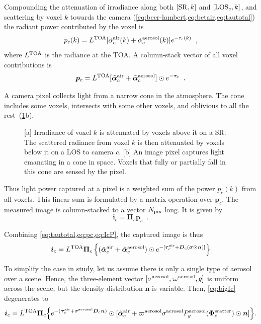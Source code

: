 \documentclass[10pt,letterpaper]{article}
\newcommand{\vect}[1]{\bm{#1}}
\newcommand{\yoavcomment}[1]{}
\renewcommand{\yoavcomment}[1]{#1} %
\begin{document}
Compounding the attenuation of irradiance along both $[{\rm SR},k]$
and $[{\rm LOS}_c,k]$, and scattering by voxel $k$ towards the camera
(\cref{eq:beer-lambert,eq:betair,eq:tautotal}) the radiant power
contributed by the voxel is
\begin{equation}
  p_c(k)= L^{\rm TOA}
  [\tilde{\alpha}^{\rm air}_c(k) + \tilde{\alpha}^{\rm aerosol}_c(k)]
  e^{-\tau_c(k)}
  \;\;,
  \label{eq:ick}
\end{equation}
where $L^{\rm TOA}$ is the radiance at the TOA. A column-stack vector
of all voxel contributions is
\begin{equation}
  {\bm p}_c= L^{\rm TOA}
  [\tilde{\vect{\alpha}}^{\rm air}_c + \tilde{\vect{\alpha}}^{\rm aerosol}_c]
  \odot e^{-\vect{\tau}_c}
  \;\;.
  \label{eq:pc}
\end{equation}

A camera pixel collects light from a narrow cone in the
atmosphere. The cone includes some voxels, intersects with some other
voxels, and oblivious to all the rest~(\cref{fig:projection}b).
\begin{figure}
  \centering
  \yoavcomment{\def\svgwidth{0.8\columnwidth}}
  \caption{\small [a] Irradiance of voxel $k$ is attenuated by voxels
    above it on a SR. The scattered radiance from voxel $k$ is then
    attenuated by voxels below it on a LOS to camera $c$.  [b] An
    image pixel captures light emanating in a cone in space. Voxels
    that fully or partially fall in this cone are sensed by the
    pixel.}
  \label{fig:projection}
\end{figure}
Thus light power captured at a pixel is a weighted sum of the power
$p_c(k)$ from all voxels.  This linear sum is formulated by a matrix
operation over ${\bm p}_c$. The measured image is column-stacked to a
vector $N_{\rm pix}$ long. It is given by
\begin{equation}
  {\bm i}_c= {\vect{\Pi}}_c{\bm p}_c
  \;\;.
  \label{eq:IcP}
\end{equation}

Combining \cref{eq:tautotal,eq:pc,eq:IcP}, the captured image is thus
\begin{align}
  {\bm i}_c= L^{\rm TOA} {\vect{\Pi}}_c \left\{
    (\tilde{\vect{\alpha}}^{\rm air}_c + \tilde{\vect{\alpha}}^{\rm
      aerosol}_c) \odot e^{-[\vect{\tau}_c^{\rm air} + {\bm D}_c
      (\vect{\sigma} \odot {\bm n})]} \right\}
  \label{eq:bigIc}
\end{align}

To simplify the case in study, let us assume there is only a single
type of aerosol over a scene. Hence, the three-element vector
$[{\sigma}^{\rm aerosol},\varpi^{\rm aerosol},g]$ is uniform across
the scene, but the density distribution ${\bm n}$ is variable. Then,
\cref{eq:bigIc} degenerates to
\begin{align}
  {\bm i}_c= L^{\rm TOA} {\vect{\Pi}}_c \Big\{ e^{-(\vect{\tau}_c^{\rm
      air} + {\sigma}^{\rm aerosol} {\bm D}_c {\bm n}) }\odot
  [\tilde{\vect{\alpha}}^{\rm air}_c + 
  \varpi^{\rm aerosol}\sigma^{\rm aerosol} P^{\rm
    aerosol}_g(\vect{\Phi}^{\rm scatter}_c) \odot{\bm n} ] \Big\} .
  \label{eq:bigIA}
\end{align}
\end{document}
